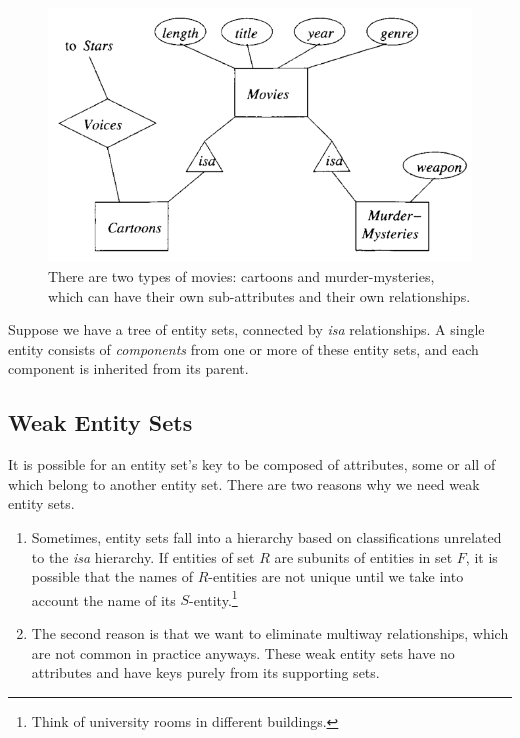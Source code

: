 \documentclass{article}
\begin{document}
    \begin{figure}[H]
      \centering 
      \includegraphics[scale=0.4]{img/isa.png}
      \caption{There are two types of movies: cartoons and murder-mysteries, which can have their own sub-attributes and their own relationships.} 
      \label{fig:isa}
    \end{figure}

    Suppose we have a tree of entity sets, connected by \textit{isa} relationships. A single entity consists of \textit{components} from one or more of these entity sets, and each component is inherited from its parent. 

  \subsection{Weak Entity Sets}

    It is possible for an entity set's key to be composed of attributes, some or all of which belong to another entity set. There are two reasons why we need weak entity sets. 
    \begin{enumerate}
      \item Sometimes, entity sets fall into a hierarchy based on classifications unrelated to the \textit{isa} hierarchy. If entities of set $R$ are subunits of entities in set $F$, it is possible that the names of $R$-entities are not unique until we take into account the name of its $S$-entity.\footnote{Think of university rooms in different buildings.}
      \item The second reason is that we want to eliminate multiway relationships, which are not common in practice anyways. These weak entity sets have no attributes and have keys purely from its supporting sets. 
    \end{enumerate}
\end{document}
